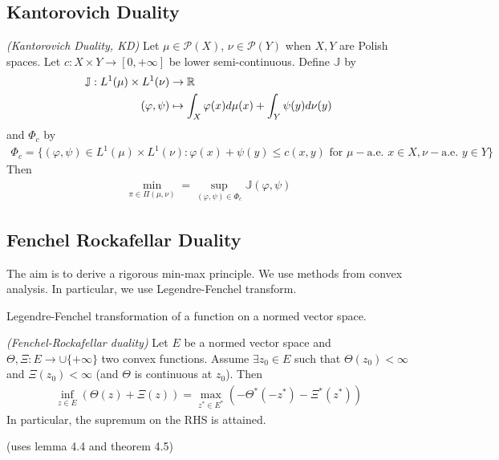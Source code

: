 \documentclass[10pt,a4paper]{article}
\begin{document}
\subsection{Kantorovich Duality}

 \emph{(Kantorovich Duality, KD)} Let $\mu \in \mathscr{P}(X)$, $\nu \in \mathscr{P}(Y)$ when $X, Y$ are Polish spaces. Let $c: X\times Y \rightarrow [0, +\infty]$ be lower semi-continuous. Define $\mathbb{J}$ by
\begin{align*}
\mathbb{J} : L^1(\mu) \times L^1(\nu) & \rightarrow \mathbb{R} \\
(\varphi, \psi) & \mapsto \int_X \varphi(x) d\mu(x) + \int_Y \psi(y)d\nu(y)
\end{align*}
and $\Phi_c$ by
\begin{align*}
\Phi_c = \{ (\varphi, \psi) \in L^1(\mu) \times L^1(\nu) : \varphi(x) + \psi(y) \leq c(x,y) \text{ for } \mu-\text{a.e. } x\in X, \nu-\text{a.e. } y\in Y \}
\end{align*}
Then
\begin{align*}
\min_{\pi \in \Pi(\mu, \nu)} = \sup_{(\varphi, \psi)\in \Phi_c} \mathbb{J}(\varphi, \psi)
\end{align*}
\s

\subsection{Fenchel Rockafellar Duality}

The aim is to derive a rigorous min-max principle. We use methods from convex analysis. In particular, we use Legendre-Fenchel transform.
\s

 Legendre-Fenchel transformation of a function on a normed vector space.
\s

 \emph{(Fenchel-Rockafellar duality)} Let $E$ be a normed vector space and $\Theta, \Xi : E\rightarrow \cup \{+ \infty \}$ two convex functions. Assume $\exists z_0 \in E$ such that $\Theta(z_0) < \infty$ and $\Xi(z_0) < \infty$ (and $\Theta$ is continuous at $z_0$). Then
\begin{align*}
\inf_{z\in E} (\Theta(z) + \Xi(z)) = \max_{z^*\in E^*} (-\Theta^*(-z^*) - \Xi^*(z^*))
\end{align*}
In particular, the supremum on the RHS is attained. 

(uses lemma 4.4 and theorem 4.5)
\s
\end{document}
